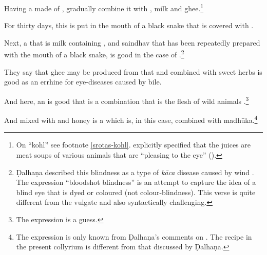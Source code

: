 \begin{translation}
    \item [33]
    
    Having  a  made of
, gradually combine it with ,
milk and ghee.\footnote{On  “kohl” see footnote
    \ref{srotas-kohl}.   explicitly specified
    that the juices are meat soups of various animals that are
    “pleasing to the eye” ().}
    
    For thirty days, this  is put in the mouth
of a black snake that is covered with .
    
    \item [34]
    
    Next, a  that is milk containing ,
     and \gls{saindhav} that has been repeatedly 
    prepared
    with the mouth of a black snake, is good in the case of .\footnote{Ḍalhaṇa described this blindness as a type
    of \emph{kāca} disease caused by wind  \citep[628]{vulgate}. The expression
    “bloodshot blindness” is an attempt to capture the idea of a blind eye that is
    dyed or coloured (not colour-blindness). This verse is quite different from the
    vulgate and also syntactically challenging.}
    
    \item [35]
    
    They say that ghee may be produced from that and combined with sweet herbs is 
    good as an errhine for eye-diseases caused by bile.
    
    And here, an  is good that is a combination that is the flesh of
    wild animals .\footnote{The expression
     is a guess.  }
    
    
    \item[36]
    
    And 
     mixed with 
     and honey is a 
     which is, in this 
    case, combined with 
    \gls{madhūka}.\footnote{The expression  
    is
    only known from Ḍalhaṇa's comments on .  The
    recipe in the present collyrium is different from that discussed by Ḍalhaṇa.}
    

\end{translation}
